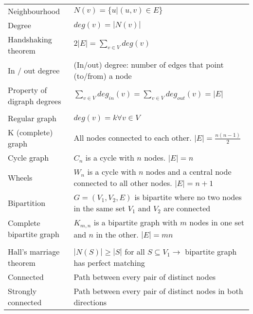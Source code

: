 \documentclass[a4paper,landscape]{article}
\begin{document}
\begin{multicols*}{2}
\begin{tabularx}{\columnwidth}{@{}lX@{}}
        Neighbourhood                    & $N(v) = \{u | (u,v) \in E\}$                                                                             \\
        Degree                           & $deg(v) = |N(v)|$                                                                                        \\
        Handshaking theorem              & $2|E| = \sum_{v \in V} deg(v)$                                                                           \\
        In / out degree                  & (In/out) degree: number of edges that point (to/from) a node                                             \\
        Property of digraph degrees      & $\sum_{v\in V} deg_{in}(v) = \sum_{v\in V} deg_{out}(v) = |E|$                                           \\
        \\
        Regular graph                    & $deg(v) = k \forall v \in V$                                                                             \\
        K (complete) graph               & All nodes connected to each other. $|E| = \frac{n(n-1)}{2}$                                              \\
        Cycle graph                      & $C_n$ is a cycle with $n$ nodes. $|E| = n$                                                               \\
        Wheels                           & $W_n$ is a cycle with $n$ nodes and a central node connected to all other nodes. $|E| = n + 1$           \\
        Bipartition                      & $G = (V_1, V_2, E)$ is bipartite where no two nodes in the same set $V_1$ and $V_2$ are connected        \\
        Complete bipartite graph         & $K_{m,n}$ is a bipartite graph with $m$ nodes in one set and $n$ in the other. $|E| = mn$                \\
        \\
        Hall's marriage theorem          & $|N(S)| \geq |S|$ for all $S \subseteq V_1 \to $ bipartite graph has perfect matching                    \\
        Connected                        & Path between every pair of distinct nodes                                                                \\
        Strongly connected               & Path between every pair of distinct nodes in both directions                                             \\

\end{tabularx}
\end{multicols*}
\end{document}
